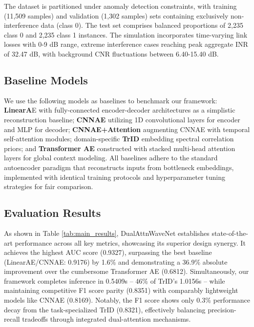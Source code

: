 \documentclass[conference]{IEEEtran}
\begin{document}
The dataset is partitioned under anomaly detection constraints, with training (11,509 samples) and validation (1,302 samples) sets containing exclusively non-interference data (class 0). The test set comprises balanced proportions of 2,235 class 0 and 2,235 class 1 instances. The simulation incorporates time-varying link losses with 0-9 dB range, extreme interference cases reaching peak aggregate INR of 32.47 dB, with background CNR fluctuations between 6.40-15.40 dB.

\subsection{Baseline Models}

We use the following models as baselines to benchmark our framework: \textbf{LinearA}E with fully-connected encoder-decoder architectures as a simplistic reconstruction baseline; \textbf{CNNAE} utilizing 1D convolutional layers for encoder and MLP for decoder; \textbf{CNNAE+Attention} augmenting CNNAE with temporal self-attention modules; domain-specific \textbf{TrID} embedding spectral correlation priors; and \textbf{Transformer AE} constructed with stacked multi-head attention layers for global context modeling. All baselines adhere to the standard autoencoder paradigm that reconstructs inputs from bottleneck embeddings, implemented with identical training protocols and hyperparameter tuning strategies for fair comparison.

\subsection{Evaluation Results}

As shown in Table \ref{tab:main_results}, DualAttnWaveNet establishes state-of-the-art performance across all key metrics, showcasing its superior design synergy. It achieves the highest AUC score (0.9327), surpassing the best baseline (LinearAE/CNNAE: 0.9176) by 1.6\% and demonstrating a 36.9\% absolute improvement over the cumbersome Transformer AE (0.6812). Simultaneously, our framework completes inference in 0.5409s – 46\% of TrID's 1.0156s – while maintaining competitive F1 score parity (0.8351) with comparably lightweight models like CNNAE (0.8169). Notably, the F1 score shows only 0.3\% performance decay from the task-specialized TrID (0.8321), effectively balancing precision-recall tradeoffs through integrated dual-attention mechanisms.
\end{document}
